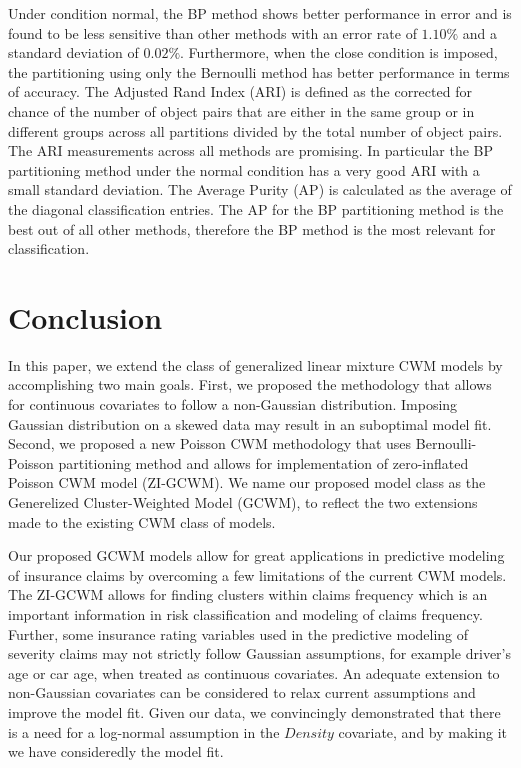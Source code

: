 \documentclass[11pt,letterpaper]{article}
\numberwithin{equation}{section}
\numberwithin{equation}{section}
\numberwithin{equation}{section}
\begin{document}
 Under condition normal, the BP method shows better performance in error and is found to be less sensitive than other methods with an error rate of $ 1.10 \% $ and a standard deviation of $ 0.02 \% $.  Furthermore, when the close condition is imposed, the partitioning using only the Bernoulli method has better performance in terms of accuracy. The Adjusted Rand Index (ARI) is defined as the corrected for chance of the number of object pairs that are either in the same group or in different groups across all partitions divided by the total number of object pairs.
 The ARI measurements across all methods are promising. In particular the BP partitioning method under the normal condition has a very good ARI with a small standard deviation. The Average Purity (AP) is calculated as the average of the diagonal classification entries. 
The AP for the BP partitioning method is the best out of all other methods, therefore the BP method is the most relevant for classification.

\section{Conclusion}

In this paper, we extend the class of generalized linear mixture CWM models by accomplishing two main goals. First, we proposed the methodology that allows for continuous covariates to follow a non-Gaussian distribution. Imposing Gaussian distribution on a skewed data may result in an suboptimal model fit. Second, we proposed a new Poisson CWM methodology that uses Bernoulli-Poisson partitioning method and allows for implementation of zero-inflated Poisson CWM model (ZI-GCWM). We name our proposed model class as the Generelized Cluster-Weighted Model (GCWM), to reflect the two extensions made to the existing CWM class of models.

Our proposed GCWM models allow for great applications in predictive modeling of insurance claims by overcoming a few limitations of the current CWM models. The ZI-GCWM allows for finding clusters within claims frequency which is an important information in risk classification and modeling of claims frequency. Further, some insurance rating variables used in the predictive modeling of severity claims may not strictly follow Gaussian assumptions, for example driver's age or car age, when treated as continuous covariates. An adequate extension to non-Gaussian covariates can be considered to relax current assumptions and improve the model fit. Given our data, we convincingly demonstrated that there is a need for a log-normal assumption in the $Density$ covariate, and by making it we have consideredly the model fit. 
\end{document}
